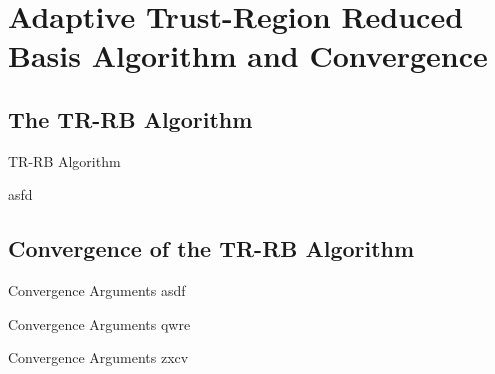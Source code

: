 \section{Adaptive Trust-Region Reduced Basis Algorithm and Convergence}

\subsection{The TR-RB Algorithm}

\begin{frame}{TR-RB Algorithm}
    \begin{algorithm}[H]
        asfd\;
    \end{algorithm}
\end{frame}

\subsection{Convergence of the TR-RB Algorithm}

\begin{frame}{Convergence Arguments}
    asdf~\cite{Qian2017}
\end{frame}

\begin{frame}{Convergence Arguments}
    qwre~\cite{Keil2021}
\end{frame}

\begin{frame}{Convergence Arguments}
    zxcv~\cite{Banholzer2020}
\end{frame}